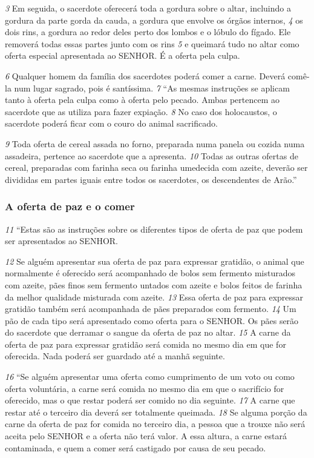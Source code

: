 \smallskip
\textit{\tiny 3} 
Em seguida, o sacerdote oferecerá toda a gordura sobre o altar, incluindo a gordura
da parte gorda da cauda, a gordura que envolve os órgãos internos, 
\textit{\tiny 4} 
os dois rins, a gordura ao redor deles perto dos lombos e o lóbulo do fígado. Ele removerá todas
essas partes junto com os rins 
\textit{\tiny 5} 
e queimará tudo no altar como oferta especial
apresentada ao SENHOR. É a oferta pela culpa. 

\smallskip
\textit{\tiny 6} 
Qualquer homem da família dos
sacerdotes poderá comer a carne. Deverá comê-la num lugar sagrado, pois é
santíssima. 
\textit{\tiny 7} 
“As mesmas instruções se aplicam tanto à oferta pela culpa como à oferta pelo
pecado. Ambas pertencem ao sacerdote que as utiliza para fazer expiação. 
\textit{\tiny 8} 
No caso dos holocaustos, o sacerdote poderá ficar com o couro do animal
sacrificado. 

\smallskip
\textit{\tiny 9} 
Toda oferta de cereal assada no forno, preparada numa panela ou
cozida numa assadeira, pertence ao sacerdote que a apresenta. 
\textit{\tiny 10}
Todas as outras
ofertas de cereal, preparadas com farinha seca ou farinha umedecida com azeite,
deverão ser divididas em partes iguais entre todos os sacerdotes, os descendentes
de Arão.”

\bigskip
\subsubsection*{A oferta de paz e o comer}  
\textit{\tiny 11}
“Estas são as instruções sobre os diferentes tipos de oferta de paz que podem
ser apresentados ao SENHOR. 

\smallskip
\textit{\tiny 12}
Se alguém apresentar sua oferta de paz para
expressar gratidão, o animal que normalmente é oferecido será acompanhado de
bolos sem fermento misturados com azeite, pães finos sem fermento untados
com azeite e bolos feitos de farinha da melhor qualidade misturada com azeite.
\textit{\tiny 13}
Essa oferta de paz para expressar gratidão também será acompanhada de pães
preparados com fermento. 
\textit{\tiny 14}
Um pão de cada tipo será apresentado como oferta
para o SENHOR. Os pães serão do sacerdote que derramar o sangue da oferta de
paz no altar. 
\textit{\tiny 15}
A carne da oferta de paz para expressar gratidão será comida no
mesmo dia em que for oferecida. Nada poderá ser guardado até a manhã
seguinte.
   
\smallskip
\textit{\tiny 16}
“Se alguém apresentar uma oferta como cumprimento de um voto ou como
oferta voluntária, a carne será comida no mesmo dia em que o sacrifício for
oferecido, mas o que restar poderá ser comido no dia seguinte. 
\textit{\tiny 17}
A carne que
restar até o terceiro dia deverá ser totalmente queimada. 
\textit{\tiny 18}
Se alguma porção da
carne da oferta de paz for comida no terceiro dia, a pessoa que a trouxe não será
aceita pelo SENHOR e a oferta não terá valor. A essa altura, a carne estará
contaminada, e quem a comer será castigado por causa de seu pecado.
   
